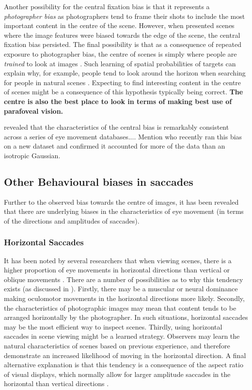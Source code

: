 \documentclass[a4paper, twocolumn, oneside, 10pt]{article}
\begin{document}
Another possibility for the central fixation bias is that it represents a \emph{photographer bias} as photographers tend to frame their shots to include the most important content in the centre of the scene. However, when \cite{tatler2007} presented scenes where the image features were biased towards the edge of the scene, the central fixation bias persisted. The final possibility is that as a consequence of repeated exposure to photographer bias, the centre of scenes is simply where people are \emph{trained} to look at images \citep{Parkhurst:2002vo}. Such learning of spatial probabilities of targets can explain why, for example, people tend to look around the horizon when searching for people in natural scenes \citep{birmingham2009, torralba2006, ehinger2009}. Expecting to find interesting content in the centre of scenes might be a consequence of this hypothesis typically being correct. \textbf{The centre is also the best place to look in terms of making best use of parafoveal vision.}

\cite{clarke-tatler2014} revealed that the characteristics of the central bias is remarkably consistent across a series of eye movement databases.... Mention \cite{nuthmann2015} who recently ran this bias on a new dataset and confirmed it accounted for more of the data than an isotropic Gaussian.

\subsection{Other Behavioural biases in saccades}
Further to the observed bias towards the centre of images, it has been revealed that there are underlying biases in the characteristics of eye movement (in terms of the directions and amplitudes of saccades).

\subsubsection{Horizontal Saccades}
It has been noted by several researchers that when viewing scenes, there is a higher proportion of eye movements in horizontal directions than vertical or oblique movements \citep{gilchrist2006,Foulsham2008,tatler-vincent2009, brandt1945, crundeall-underwood1998}. There are a number of possibilities as to why this tendency exists (as discussed in \cite{Foulsham2008}). Firstly, there may be a muscular or neural dominance making oculomotor movements in the horizontal directions more likely. Secondly, the characteristics of photographic images may mean that content tends to be arranged horizontally by the photographer. In such situations, horizontal saccades may be the most efficient way to inspect scenes. Thirdly, using horizontal saccades in scene viewing might be a learned strategy. Observers may learn the natural characteristics of scenes based on previous experience, and therefore demonstrate an increased likelihood of moving in the horizontal direction. A final alternative explanation is that this tendency is a consequence of the aspect ratio of visual displays, which normally allow for larger amplitude saccades in the horizontal than vertical directions \citep{wartburg2007}.
\end{document}
